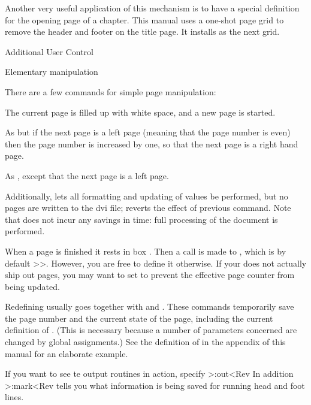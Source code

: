Another very useful application of this mechanism is to have a
special definition for the opening page of a chapter. This manual uses a
one-shot page grid  to remove the header and footer on the
title page. It installs  as the next grid.

\Section Additional User Control

\SubSection Elementary manipulation

There are a few commands for simple page manipulation:
\Description\item {}
The current page is filled up with white space, and
a new page is started.\item {}
As  but if the next page is a left page (meaning
that the page number is even) then the page number is increased by
one, so that the next page is a right hand page.\item {}
As , except that the next page is a left page.
\>

Additionally,  lets
all formatting and updating of values be performed, but
no pages are written to the dvi file;
reverts the effect of previous command. Note that  does not
incur any savings in time: full processing of the document is performed.
 
When a page is finished it rests in box . Then a call is
made  to , which is by default
\ver>\shipout\box\WholePage>. However, you are free to define it
otherwise. If your  does not actually ship out pages,
you may want to set  to prevent the effective page
counter from being updated.

Redefining  usually goes together with
 and . These commands
temporarily save the page number and the current state of the page,
including the current definition of . (This is necessary
because a number of parameters concerned are changed by global
assignments.) See the definition of  in the appendix of
this manual for an elaborate example. 

If you want to see te output routines in action, specify
\Ver>\Trace:out<Rev In addition \Ver>\Trace:mark<Rev tells you what
information is being saved for running head and foot lines.

\endinput

92/11/20 Left right output examples
93/01/17 New description of \CurrentShipout
